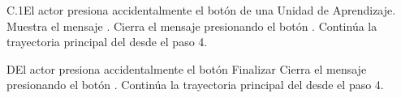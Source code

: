 \begin{UCtrayectoriaA}{C.1}{El actor presiona accidentalmente el botón  de una Unidad de Aprendizaje.}
	\UCpaso Muestra el mensaje .
	\UCpaso[\UCactor] Cierra el mensaje presionando el botón .
    \UCpaso Continúa la trayectoria principal del  desde el paso 4.
\end{UCtrayectoriaA}
\begin{UCtrayectoriaA}{D}{El actor presiona accidentalmente el botón Finalizar}
    \UCpaso[\UCactor] Cierra el mensaje presionando el botón .
    \UCpaso Continúa la trayectoria principal del  desde el paso 4.
\end{UCtrayectoriaA}